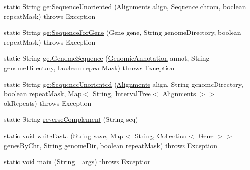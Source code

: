 \begin{DoxyCompactItemize}
\item 
static String \hyperlink{classbroad_1_1pda_1_1rnai_1_1_extract_sequence_aca3dde68780e27cb0abef06e4bc17edc}{get\+Sequence\+Unoriented} (\hyperlink{classbroad_1_1pda_1_1datastructures_1_1_alignments}{Alignments} align, \hyperlink{classbroad_1_1core_1_1sequence_1_1_sequence}{Sequence} chrom, boolean repeat\+Mask)  throws Exception
\item 
static String \hyperlink{classbroad_1_1pda_1_1rnai_1_1_extract_sequence_a086dda3c43c13dc2bb40a0a1f54e1631}{get\+Sequence\+For\+Gene} (Gene gene, String genome\+Directory, boolean repeat\+Mask)  throws Exception
\item 
static String \hyperlink{classbroad_1_1pda_1_1rnai_1_1_extract_sequence_aaf80072fdbceac344f758b410f9001b2}{get\+Genome\+Sequence} (\hyperlink{interfacebroad_1_1core_1_1annotation_1_1_genomic_annotation}{Genomic\+Annotation} annot, String genome\+Directory, boolean repeat\+Mask)  throws Exception 
\item 
static String \hyperlink{classbroad_1_1pda_1_1rnai_1_1_extract_sequence_a3dd5cc663c39b380686655f256035fa3}{get\+Sequence\+Unoriented} (\hyperlink{classbroad_1_1pda_1_1datastructures_1_1_alignments}{Alignments} align, String genome\+Directory, boolean repeat\+Mask, Map$<$ String, Interval\+Tree$<$ \hyperlink{classbroad_1_1pda_1_1datastructures_1_1_alignments}{Alignments} $>$$>$ ok\+Repeats)  throws Exception
\item 
static String \hyperlink{classbroad_1_1pda_1_1rnai_1_1_extract_sequence_a64d8ff8c0584903be975e781630b8736}{reverse\+Complement} (String seq)
\item 
static void \hyperlink{classbroad_1_1pda_1_1rnai_1_1_extract_sequence_acd8fb7b2a36ea851fed12a8b7b1bf1b6}{write\+Fasta} (String save, Map$<$ String, Collection$<$ Gene $>$$>$ genes\+By\+Chr, String genome\+Dir, boolean repeat\+Mask)  throws Exception
\item 
static void \hyperlink{classbroad_1_1pda_1_1rnai_1_1_extract_sequence_a64eae6b9137fc522b16e2710dde38db4}{main} (String\mbox{[}$\,$\mbox{]} args)  throws Exception
\end{DoxyCompactItemize}


